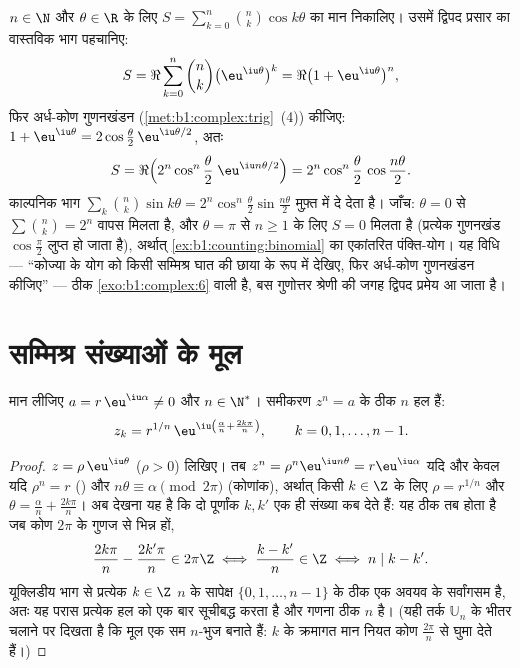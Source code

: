 \begin{example}[एक द्विपद त्रिकोणमितीय योग]\label{ex:b1:complex:binomsum}
$n \in \N$ और $\theta \in \R$ के लिए $S = \sum_{k=0}^{n}\binom nk \cos
k\theta$ का मान निकालिए। उसमें द्विपद प्रसार का वास्तविक भाग पहचानिए:
\[
S = \Re\sum_{k=0}^n \binom nk \bigl(\eu^{\iu\theta}\bigr)^k
= \Re\bigl(1 + \eu^{\iu\theta}\bigr)^n ,
\]
फिर अर्ध-कोण गुणनखंडन (\cref{met:b1:complex:trig}~(4)) कीजिए: $1 +
\eu^{\iu\theta} = 2\cos\frac\theta2\,\eu^{\iu\theta/2}$, अतः
\[
S = \Re\Bigl(2^n\cos^n\frac\theta2\;\eu^{\iu n\theta/2}\Bigr)
= 2^n \cos^n\frac\theta2\,\cos\frac{n\theta}2 .
\]
काल्पनिक भाग $\sum_k\binom nk\sin k\theta =
2^n\cos^n\frac\theta2\sin\frac{n\theta}2$ मुफ़्त में दे देता है। जाँच:
$\theta = 0$ से $\sum\binom nk = 2^n$ वापस मिलता है, और $\theta = \pi$ से $n
\geq 1$ के लिए $S = 0$ मिलता है (प्रत्येक गुणनखंड $\cos\frac\pi2$ लुप्त हो
जाता है), अर्थात् \cref{ex:b1:counting:binomial} का एकांतरित पंक्ति-योग। यह
विधि --- ``कोज्या के योग को किसी सम्मिश्र घात की छाया के रूप में देखिए, फिर
अर्ध-कोण गुणनखंडन कीजिए'' --- ठीक \cref{exo:b1:complex:6} वाली है, बस
गुणोत्तर श्रेणी की जगह द्विपद प्रमेय आ जाता है।
\end{example}

\section{सम्मिश्र संख्याओं के मूल}

\begin{theorem}[$n$-वें मूल]\label{thm:b1:complex:roots}
मान लीजिए $a = r\,\eu^{\iu\alpha} \neq 0$ और $n \in \N^*$। समीकरण $z^n = a$
के ठीक $n$ हल हैं:
\[
z_k = r^{1/n}\, \eu^{\iu\left(\frac{\alpha}{n} +
\frac{2k\pi}{n}\right)},
\qquad k = 0, 1, \dots, n - 1 .
\]
\end{theorem}

\begin{proof}
$z = \rho\,\eu^{\iu\theta}$ ($\rho > 0$) लिखिए। तब $z^n = \rho^n \eu^{\iu
n\theta} = r \eu^{\iu\alpha}$ यदि और केवल यदि $\rho^n = r$ () और
$n\theta \equiv \alpha \pmod{2\pi}$ (कोणांक), अर्थात् किसी $k \in \Z$ के लिए
$\rho = r^{1/n}$ और $\theta = \frac{\alpha}{n} + \frac{2k\pi}{n}$। अब देखना
यह है कि दो पूर्णांक $k, k'$ एक ही संख्या कब देते हैं: यह ठीक तब होता है जब
कोण $2\pi$ के गुणज से भिन्न हों,
\[
\frac{2k\pi}n - \frac{2k'\pi}n \in 2\pi\Z
\iff \frac{k - k'}n \in \Z
\iff n \mid k - k' .
\]
यूक्लिडीय भाग से प्रत्येक $k \in \Z$ $n$ के सापेक्ष $\{0, 1, \dots, n-1\}$
के ठीक एक अवयव के सर्वांगसम है, अतः यह परास प्रत्येक हल को एक बार सूचीबद्ध
करता है और गणना ठीक $n$ है। (यही तर्क $\mathbb U_n$ के भीतर चलाने पर दिखता
है कि मूल एक सम $n$-भुज बनाते हैं: $k$ के क्रमागत मान नियत कोण
$\frac{2\pi}n$ से घुमा देते हैं।)
\end{proof}


